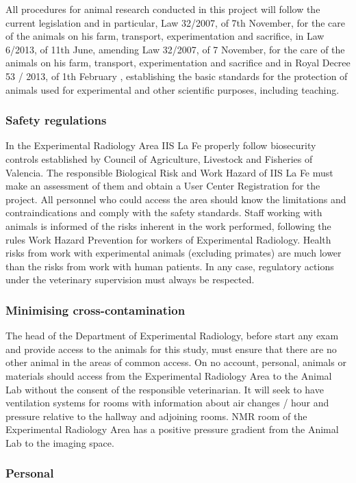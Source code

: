 All procedures for animal research conducted in this project will follow the current legislation and in particular, Law 32/2007, of 7th November, for the care of the animals on his farm, transport, experimentation and sacrifice, in Law 6/2013, of 11th June, amending Law 32/2007, of 7 November, for the care of the animals on his farm, transport, experimentation and sacrifice and in Royal Decree 53 / 2013, of 1th February , establishing the basic standards for the protection of animals used for experimental and other scientific purposes, including teaching.

\subsubsection*{Safety regulations}
In the Experimental Radiology Area IIS La Fe properly follow biosecurity controls established by Council of Agriculture, Livestock and Fisheries of Valencia. The responsible Biological Risk and Work Hazard of IIS La Fe must make an assessment of them and obtain a User Center Registration for the project.
All personnel who could access the area should know the limitations and contraindications and comply with the safety standards.
Staff working with animals is informed of the risks inherent in the work performed, following the rules Work Hazard Prevention for workers of Experimental Radiology.
Health risks from work with experimental animals (excluding primates) are much lower than the risks from work with human patients. In any case, regulatory actions under the veterinary supervision must always be respected.

\subsubsection*{Minimising cross-contamination}

The head of the Department of Experimental Radiology, before start any exam and provide access to the animals for this study, must ensure that there are no other animal in the areas of common access.
On no account, personal, animals or materials should access from the Experimental Radiology Area to the Animal Lab without the consent of the responsible veterinarian.
It will seek to have ventilation systems for rooms with information about air changes / hour and pressure relative to the hallway and adjoining rooms.
NMR room of the Experimental Radiology Area has a positive pressure gradient from the Animal Lab to the imaging space. 

\subsubsection*{Personal}

